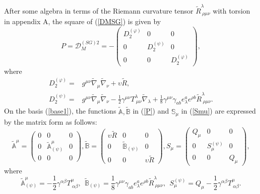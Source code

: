 \documentclass{ptephy}%
\begin{document}
After some algebra in terms of the Riemann curvature tensor $\tilde{R}^\lambda_{\ \rho\mu\nu}$ with torsion in appendix A, 
the square of (\ref{DMSG}) is given by
\begin{equation}
P=\mathcal{D}_M^{(SG)2} =  -\begin{pmatrix}
D_2^{(\varphi)} & 0 & 0\\
0 & D_2^{(\psi)} & 0\\
0 & 0 & D_2^{(\varphi)}
\end{pmatrix} , \label{D_2}
\end{equation}
where 
\begin{align}
D_2^{(\varphi)} = & g^{\mu\nu}\tilde{\nabla}_\mu\tilde{\nabla}_\nu + \upsilon\tilde{R}, \\
D_2^{(\psi)} = & g^{\mu\nu}\tilde{\nabla}_\mu\tilde{\nabla}_\nu
 -\frac{1}{2}\gamma^{\mu\nu}T^\lambda_{\ \mu\nu}\tilde{\nabla}_\lambda
 +\frac{1}{8}\gamma^{\mu\nu}\gamma_{ab}e_\lambda^a e^{\rho b}\tilde{R}^\lambda_{\ \rho\mu\nu}. \label{D2PSI}
\end{align}
On the basis (\ref{base1}), the functions $\tilde{\mathbb{A}},\tilde{\mathbb{B}}$ in (\ref{P}) and $\mathbb{S}_\mu$ in (\ref{Smu}) 
are expressed by the matrix form as follows:%
\begin{equation}
\tilde{\mathbb{A}}^\mu = \begin{pmatrix}
0 & 0 & 0\\
0 & \tilde{\mathbb{A}}^\mu_{(\psi)} & 0\\
0 & 0 & 0
\end{pmatrix} , 
\tilde{\mathbb{B}} = \begin{pmatrix}
\upsilon \tilde{R} & 0 & 0\\
0 & \tilde{\mathbb{B}}_{(\psi)} & 0\\
0 & 0 & \upsilon\tilde{R}
\end{pmatrix},
S_\mu = \begin{pmatrix}
Q_\mu & 0 & 0\\
0 & S_\mu^{(\psi)} & 0\\
0 & 0 & Q_\mu
\end{pmatrix}, \label{ABSmu}
\end{equation}
where 
\begin{equation}
\tilde{\mathbb{A}}^\mu_{(\psi)} =  -\frac{1}{2}\gamma^{\alpha\beta}T^\mu_{\ \alpha\beta},\ \ 
\tilde{\mathbb{B}}_{(\psi)} =  \frac{1}{8}\gamma^{\mu\nu}\gamma_{ab}e_\lambda^a e^{\rho b}\tilde{R}^\lambda_{\ \rho\mu\nu},\ \ 
S_\mu^{(\psi)} = Q_\mu -\frac{1}{2}\gamma^{\alpha\beta}T^\mu_{\ \alpha\beta}.
\end{equation}
\end{document}
